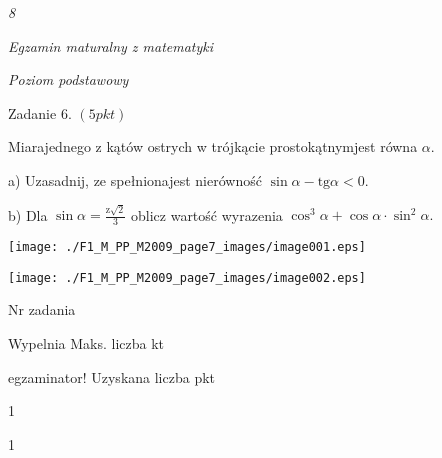 \documentclass[a4paper,12pt]{article}
\begin{document}
{\it 8}

{\it Egzamin maturalny z matematyki}

{\it Poziom podstawowy}

Zadanie 6. $(5pkt)$

Miarajednego z kątów ostrych w trójkącie prostokątnymjest równa $\alpha.$

a) Uzasadnij, ze spełnionajest nierówność $\sin\alpha-\mathrm{t}\mathrm{g}\alpha<0.$

b) Dla $\displaystyle \sin\alpha=\frac{\mathrm{z}\sqrt{2}}{3}$ oblicz wartość wyrazenia $\cos^{3}\alpha+\cos\alpha\cdot\sin^{2}\alpha.$
\begin{center}
\texttt{[image: ./F1\_M\_PP\_M2009\_page7\_images/image001.eps]}

\texttt{[image: ./F1\_M\_PP\_M2009\_page7\_images/image002.eps]}
\end{center}
Nr zadania

Wypelnia Maks. liczba kt

egzaminator! Uzyskana liczba pkt

1

1
\end{document}
